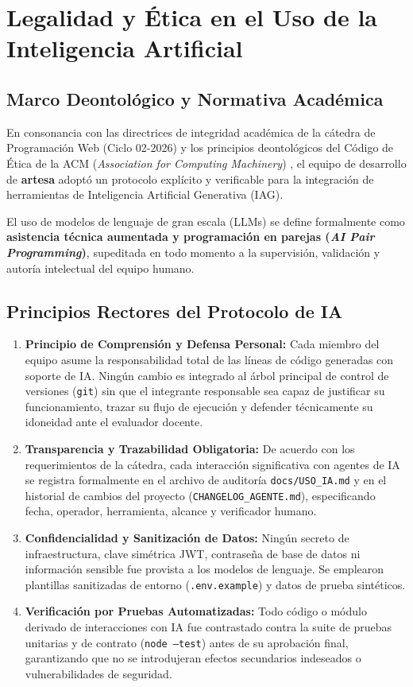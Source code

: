 \section{Legalidad y Ética en el Uso de la Inteligencia Artificial}
\label{sec:legalidad_ia}

\subsection{Marco Deontológico y Normativa Académica}
En consonancia con las directrices de integridad académica de la cátedra de Programación Web (Ciclo 02-2026) y los principios deontológicos del Código de Ética de la ACM (\textit{Association for Computing Machinery}) \cite{acm_ai_ethics}, el equipo de desarrollo de \textbf{artesa} adoptó un protocolo explícito y verificable para la integración de herramientas de Inteligencia Artificial Generativa (IAG).

El uso de modelos de lenguaje de gran escala (LLMs) se define formalmente como \textbf{asistencia técnica aumentada y programación en parejas (\textit{AI Pair Programming})}, supeditada en todo momento a la supervisión, validación y autoría intelectual del equipo humano.

\subsection{Principios Rectores del Protocolo de IA}

\begin{enumerate}
    \item \textbf{Principio de Comprensión y Defensa Personal:} Cada miembro del equipo asume la responsabilidad total de las líneas de código generadas con soporte de IA. Ningún cambio es integrado al árbol principal de control de versiones (\texttt{git}) sin que el integrante responsable sea capaz de justificar su funcionamiento, trazar su flujo de ejecución y defender técnicamente su idoneidad ante el evaluador docente.
    \item \textbf{Transparencia y Trazabilidad Obligatoria:} De acuerdo con los requerimientos de la cátedra, cada interacción significativa con agentes de IA se registra formalmente en el archivo de auditoría \texttt{docs/USO\_IA.md} y en el historial de cambios del proyecto (\texttt{CHANGELOG\_AGENTE.md}), especificando fecha, operador, herramienta, alcance y verificador humano.
    \item \textbf{Confidencialidad y Sanitización de Datos:} Ningún secreto de infraestructura, clave simétrica JWT, contraseña de base de datos ni información sensible fue provista a los modelos de lenguaje. Se emplearon plantillas sanitizadas de entorno (\texttt{.env.example}) y datos de prueba sintéticos.
    \item \textbf{Verificación por Pruebas Automatizadas:} Todo código o módulo derivado de interacciones con IA fue contrastado contra la suite de pruebas unitarias y de contrato (\texttt{node --test}) antes de su aprobación final, garantizando que no se introdujeran efectos secundarios indeseados o vulnerabilidades de seguridad.
\end{enumerate}


